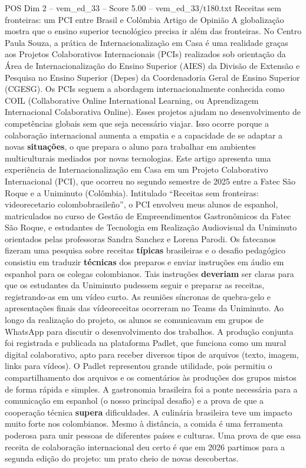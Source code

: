 \begin{textsample}{POS Dim 2 – vem\_ed\_33 – Score 5.00 – vem\_ed\_33/t180.txt}  \label{ex:f2_pos_142}
Receitas sem fronteiras: um PCI entre Brasil e Colômbia Artigo de Opinião A globalização mostra que o ensino superior tecnológico precisa ir além das fronteiras.
No Centro Paula Souza, a prática de Internacionalização em Casa é uma realidade graças aos Projetos Colaborativos Internacionais (PCIs) realizados sob orientação da Área de Internacionalização do Ensino Superior (AIES) da Divisão de Extensão e Pesquisa no Ensino Superior (Depes) da Coordenadoria Geral de Ensino Superior (CGESG).
Os PCIs seguem a abordagem internacionalmente conhecida como COIL (Collaborative Online International Learning, ou Aprendizagem Internacional Colaborativa Online).
Esses projetos ajudam no desenvolvimento de competências globais sem que seja necessário viajar.
Isso ocorre porque a colaboração internacional aumenta a empatia e a capacidade de se adaptar a novas \textbf{situações}, o que prepara o aluno para trabalhar em ambientes multiculturais mediados por novas tecnologias.
Este artigo apresenta uma experiência de Internacionalização em Casa em um Projeto Colaborativo Internacional (PCI), que ocorreu no segundo semestre de 2025 entre a Fatec São Roque e a Uniminuto (Colômbia).
Intitulado “Receitas sem fronteiras: videorecetario colombobrasileño”, o PCI envolveu meus alunos de espanhol, matriculados no curso de Gestão de Empreendimentos Gastronômicos da Fatec São Roque, e estudantes de Tecnologia em Realização Audiovisual da Uniminuto orientados pelas professoras Sandra Sanchez e Lorena Parodi.
Os fatecanos fizeram uma pesquisa sobre receitas \textbf{típicas} brasileiras e o desafio pedagógico consistiu em traduzir \textbf{técnicas} dos preparos e enviar instruções em áudio em espanhol para os colegas colombianos.
Tais instruções \textbf{deveriam} ser claras para que os estudantes da Uniminuto pudessem seguir e preparar as receitas, registrando-as em um vídeo curto.
As reuniões síncronas de quebra-gelo e apresentações finais das vídeoreceitas ocorreram no Teams da Uniminuto.
Ao longo da realização do projeto, os alunos se comunicavam em grupos de WhatsApp para discutir o desenvolvimento dos trabalhos.
A produção conjunta foi registrada e publicada na plataforma Padlet, que funciona como um mural digital colaborativo, apto para receber diversos tipos de arquivos (texto, imagem, links para vídeos).
O Padlet representou grande utilidade, pois permitiu o compartilhamento dos arquivos e os comentários às produções dos grupos mistos de forma rápida e simples.
A gastronomia brasileira foi a ponte necessária para a comunicação em espanhol (o nosso principal desafio) e a prova de que a cooperação técnica \textbf{supera} dificuldades.
A culinária brasileira teve um impacto muito forte nos colombianos.
Mesmo à distância, a comida é uma ferramenta poderosa para unir pessoas de diferentes países e culturas.
Uma prova de que essa receita de colaboração internacional deu certo é que em 2026 partimos para a segunda edição do projeto: um prato cheio de novas descobertas.

\end{textsample}
